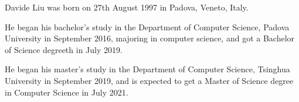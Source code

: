 
\begin{resume}

    Davide Liu was born on 27th August 1997 in Padova, Veneto, Italy. 
    
    He began his bachelor’s study in the Department of Computer Science, Padova University in September 2016, majoring in computer science, and got a Bachelor of Science degreeth in July 2019.
    
    He began his master’s study in the Department of Computer Science, Tsinghua University in September 2019, and is expected to get a Master of Science degree in Computer Science in July 2021.
    
    



  



\end{resume}
